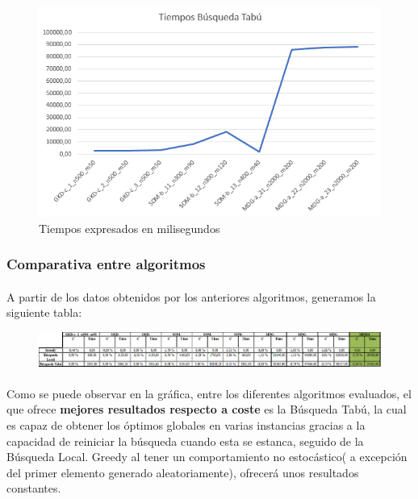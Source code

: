 \documentclass{article}
\begin{document}
	\begin{figure}[H]
		
		\centering
		\includegraphics[scale=0.4]{img/TiemposBtabu}
		\caption{Tiempos expresados en milisegundos}
		
	\end{figure}
	
	\subsubsection{Comparativa entre algoritmos}
	
	\paragraph{}A partir de los datos obtenidos por los anteriores algoritmos, generamos la siguiente tabla:
	
	\begin{figure}[H]
		
		\centering
		\includegraphics[scale=0.4]{img/Global}
		
	\end{figure}
	
	
	\paragraph{}Como se puede observar en la gráfica, entre los diferentes algoritmos evaluados, el que ofrece \textbf{mejores resultados respecto a coste} es la Búsqueda Tabú, la cual es capaz de obtener los óptimos globales en varias instancias gracias a la capacidad de reiniciar la búsqueda cuando esta se estanca, seguido de la Búsqueda Local. Greedy al tener un comportamiento no estocástico( a excepción del primer elemento generado aleatoriamente), ofrecerá unos resultados constantes.
	
\end{document}
